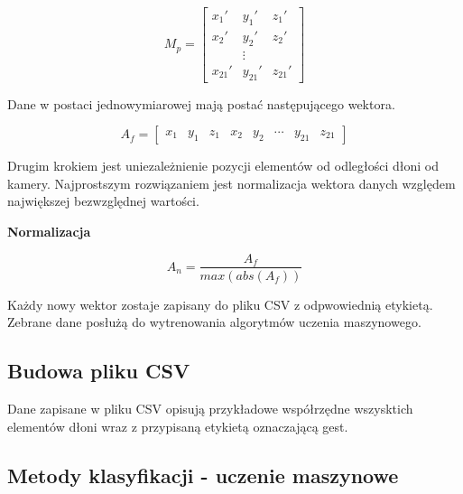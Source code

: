 \begin{equation*}
    M_p = 
    \begin{bmatrix}
    x_1' & y_1' & z_1' \\
    x_2' & y_2' & z_2' \\
        & \vdots &     \\
    x_{21}' & y_{21}' & z_{21}'
    \end{bmatrix}
\end{equation*}

Dane w postaci jednowymiarowej mają postać następującego wektora. 

\begin{equation*}
    A_f=
    \begin{bmatrix}
        x_1 & y_1 & z_1 & x_2 & y_2 & \cdots & y_{21} & z_{21}
    \end{bmatrix}
\end{equation*}


\quad Drugim krokiem jest uniezależnienie pozycji elementów od odległości dłoni od kamery. Najprostszym rozwiązaniem jest normalizacja wektora danych względem największej bezwzględnej wartości. 

\quad \textbf{Normalizacja}



\begin{equation*}
    A_n=\dfrac{A_f}{max(abs(A_f))}
\end{equation*}

\quad Każdy nowy wektor zostaje zapisany do pliku CSV z odpwowiednią etykietą. Zebrane dane posłużą do wytrenowania algorytmów uczenia maszynowego.     

\subsection{Budowa pliku CSV}
\quad Dane zapisane w pliku CSV opisują przykładowe współrzędne wszysktich elementów dłoni wraz z przypisaną etykietą oznaczającą gest. 

\subsection{Metody klasyfikacji - uczenie maszynowe}

